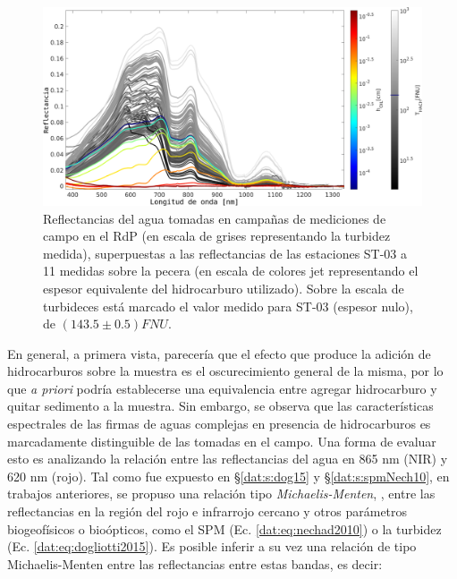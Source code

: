         \begin{figure}
            \centering
            \includegraphics[width=\textwidth]{oil/figures/reflectancias}
            \caption[Reflectancias del agua tomadas en campañas del RdP y sobre la muestra con hidrocarburos.]{Reflectancias del agua tomadas en campañas de mediciones de campo en el RdP (en escala de grises representando la turbidez medida), superpuestas a las reflectancias de las estaciones ST-03 a 11 medidas sobre la pecera (en escala de colores jet representando el espesor equivalente del hidrocarburo utilizado). Sobre la escala de turbideces está marcado el valor medido para ST-03 (espesor nulo), de $(143.5\pm0.5) FNU$.}
            \label{oil:reflectancias}
        \end{figure}
    
        En general, a primera vista, parecería que el efecto que produce la adición de hidrocarburos sobre la muestra es el oscurecimiento general de la misma, por lo que \textit{a priori} podría establecerse una equivalencia entre agregar hidrocarburo y quitar sedimento a la muestra. Sin embargo, se observa que las características espectrales de las firmas de aguas complejas en presencia de hidrocarburos es marcadamente distinguible de las tomadas en el campo.
        Una forma de evaluar esto es analizando la relación entre las reflectancias del agua en 865 nm (NIR) y 620 nm (rojo). Tal como fue expuesto en \S \ref{dat:s:dog15} y \S \ref{dat:s:spmNech10}, en trabajos anteriores, se propuso una relación tipo \textit{Michaelis-Menten}, \cite{michaelis2011}, entre las reflectancias en la región del rojo e infrarrojo cercano y otros parámetros biogeofísicos o bioópticos, como el SPM (Ec. \ref{dat:eq:nechad2010}) o la turbidez (Ec. \ref{dat:eq:dogliotti2015}). Es posible inferir a su vez una relación de tipo Michaelis-Menten entre las reflectancias entre estas bandas, es decir:
    
